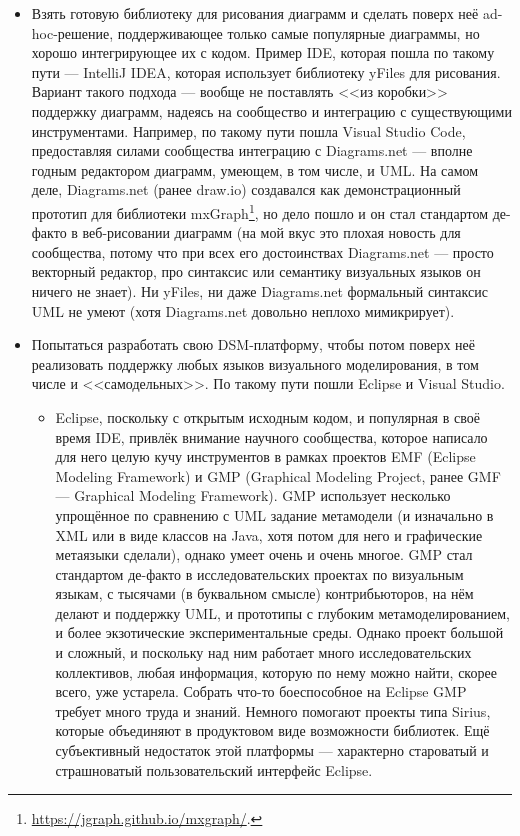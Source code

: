 \documentclass{text-style}
\begin{document}
\begin{itemize}
    \item Взять готовую библиотеку для рисования диаграмм и сделать поверх неё ad-hoc-решение, поддерживающее только самые популярные диаграммы, но хорошо интегрирующее их с кодом. Пример IDE, которая пошла по такому пути --- IntelliJ IDEA, которая использует библиотеку yFiles для рисования. Вариант такого подхода --- вообще не поставлять <<из коробки>> поддержку диаграмм, надеясь на сообщество и интеграцию с существующими инструментами. Например, по такому пути пошла Visual Studio Code, предоставляя силами сообщества интеграцию с Diagrams.net --- вполне годным редактором диаграмм, умеющем, в том числе, и UML. На самом деле, Diagrams.net (ранее draw.io) создавался как демонстрационный прототип для библиотеки mxGraph\footnote{\url{https://jgraph.github.io/mxgraph/}.}, но дело пошло и он стал стандартом де-факто в веб-рисовании диаграмм (на мой вкус это плохая новость для сообщества, потому что при всех его достоинствах Diagrams.net --- просто векторный редактор, про синтаксис или семантику визуальных языков он ничего не знает). Ни yFiles, ни даже Diagrams.net формальный синтаксис UML не умеют (хотя Diagrams.net довольно неплохо мимикрирует).
    \item Попытаться разработать свою DSM-платформу, чтобы потом поверх неё реализовать поддержку любых языков визуального моделирования, в том числе и <<самодельных>>. По такому пути пошли Eclipse и Visual Studio. 
    \begin{itemize}
        \item Eclipse, поскольку с открытым исходным кодом, и популярная в своё время IDE, привлёк внимание научного сообщества, которое написало для него целую кучу инструментов в рамках проектов EMF (Eclipse Modeling Framework) и GMP (Graphical Modeling Project, ранее GMF --- Graphical Modeling Framework). GMP использует несколько упрощённое по сравнению с UML задание метамодели (и изначально в XML или в виде классов на Java, хотя потом для него и графические метаязыки сделали), однако умеет очень и очень многое. GMP стал стандартом де-факто в исследовательских проектах по визуальным языкам, с тысячами (в буквальном смысле) контрибьюторов, на нём делают и поддержку UML, и прототипы с глубоким метамоделированием, и более экзотические экспериментальные среды. Однако проект большой и сложный, и поскольку над ним работает много исследовательских коллективов, любая информация, которую по нему можно найти, скорее всего, уже устарела. Собрать что-то боеспособное на Eclipse GMP требует много труда и знаний. Немного помогают проекты типа Sirius, которые объединяют в продуктовом виде возможности библиотек. Ещё субъективный недостаток этой платформы --- характерно староватый и страшноватый пользовательский интерфейс Eclipse.

\end{itemize}
\end{itemize}
\end{document}
